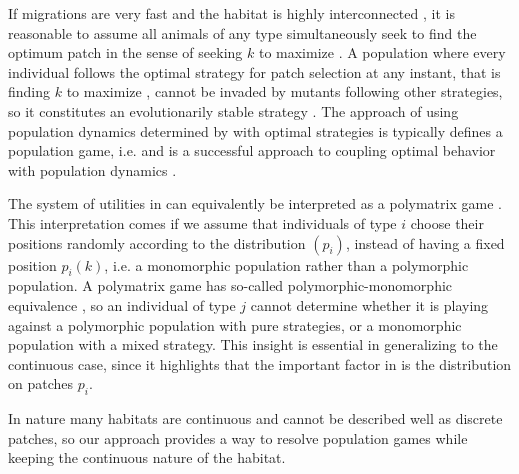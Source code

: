 If migrations are very fast and the habitat is highly interconnected \citep{abrams2007role, cressman2006migration}, it is reasonable to assume all animals of any type simultaneously seek to find the optimum patch in the sense of seeking $k$ to maximize . A population where every individual follows the optimal strategy for patch selection at any instant, that is finding $k$ to maximize , cannot be invaded by mutants following other strategies, so it constitutes an evolutionarily stable strategy \citep{kvrivan2009evolutionary}. The approach of using population dynamics determined by  with optimal strategies is typically defines a population game, i.e.  and is a successful approach to coupling optimal behavior with population dynamics \citep{kvrivan2008ideal,morris2020time,mougi2019adaptive}.



The system of utilities in  can equivalently be interpreted as a polymatrix game \citep{howson1972equilibria}. This interpretation comes if we assume that individuals of type $i$ choose their positions randomly according to the distribution $(p_i)$, instead of having a fixed position $p_i(k)$, i.e. a monomorphic population rather than a polymorphic population. A polymatrix game has so-called polymorphic-monomorphic equivalence \citep{broom2013game}, so an individual of type $j$ cannot determine whether it is playing against a polymorphic population with pure strategies, or a monomorphic population with a mixed strategy. This insight is essential in generalizing to the continuous case, since it highlights that the important factor in  is the distribution on patches $p_i$.

In nature many habitats are continuous and cannot be described well as discrete patches, so our approach provides a way to resolve population games while keeping the continuous nature of the habitat.

